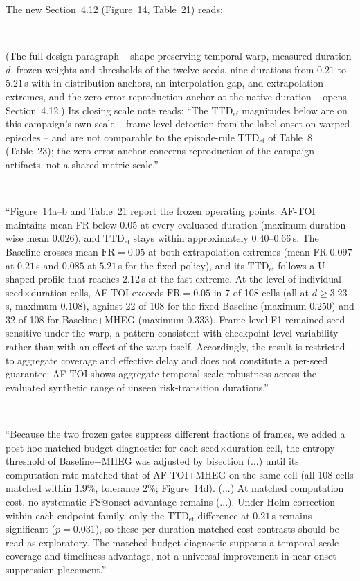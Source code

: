 \documentclass[1p,12pt,authoryear]{elsarticle}
\begin{document}
\vspace{2mm}
\noindent The new Section~4.12 (Figure~14, Table~21) reads:

~

(The full design paragraph -- shape-preserving temporal warp, measured duration $d$, frozen weights and thresholds of the twelve seeds, nine durations from $0.21$ to $5.21$\,s with in-distribution anchors, an interpolation gap, and extrapolation extremes, and the zero-error reproduction anchor at the native duration -- opens Section~4.12.) Its closing scale note reads: ``The $\mathrm{TTD}_{\mathrm{ef}}$ magnitudes below are on this campaign's own scale -- frame-level detection from the label onset on warped episodes -- and are not comparable to the episode-rule $\mathrm{TTD}_{\mathrm{ef}}$ of Table~8 (Table~23); the zero-error anchor concerns reproduction of the campaign artifacts, not a shared metric scale.''

~

``Figure~14a--b and Table~21 report the frozen operating points. AF-TOI maintains mean FR below $0.05$ at every evaluated duration (maximum duration-wise mean $0.026$), and $\mathrm{TTD}_{\mathrm{ef}}$ stays within approximately $0.40$--$0.66$\,s. The Baseline crosses mean $\mathrm{FR}=0.05$ at both extrapolation extremes (mean FR $0.097$ at $0.21$\,s and $0.085$ at $5.21$\,s for the fixed policy), and its $\mathrm{TTD}_{\mathrm{ef}}$ follows a U-shaped profile that reaches $2.12$\,s at the fast extreme. At the level of individual seed$\times$duration cells, AF-TOI exceeds $\mathrm{FR}=0.05$ in 7 of 108 cells (all at $d\ge3.23$\,s, maximum $0.108$), against 22 of 108 for the fixed Baseline (maximum $0.250$) and 32 of 108 for Baseline+MHEG (maximum $0.333$). Frame-level F1 remained seed-sensitive under the warp, a pattern consistent with checkpoint-level variability rather than with an effect of the warp itself. Accordingly, the result is restricted to aggregate coverage and effective delay and does not constitute a per-seed guarantee: AF-TOI shows aggregate temporal-scale robustness across the evaluated synthetic range of unseen risk-transition durations.''

~

``Because the two frozen gates suppress different fractions of frames, we added a post-hoc matched-budget diagnostic: for each seed$\times$duration cell, the entropy threshold of Baseline+MHEG was adjusted by bisection (...) until its computation rate matched that of AF-TOI+MHEG on the same cell (all 108 cells matched within $1.9\%$, tolerance $2\%$; Figure~14d). (...) At matched computation cost, no systematic FS@onset advantage remains (...). Under Holm correction within each endpoint family, only the $\mathrm{TTD}_{\mathrm{ef}}$ difference at $0.21$\,s remains significant ($p=0.031$), so these per-duration matched-cost contrasts should be read as exploratory. The matched-budget diagnostic supports a temporal-scale coverage-and-timeliness advantage, not a universal improvement in near-onset suppression placement.''
\end{document}
